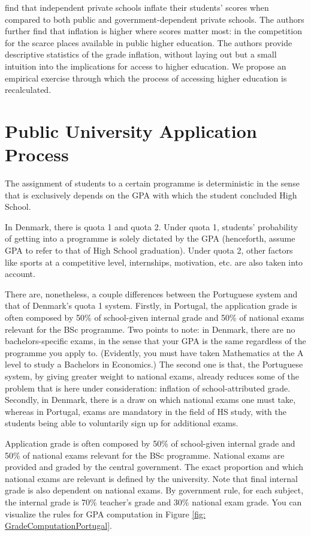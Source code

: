 \documentclass{article}
\begin{document}
\cite{nata2014unfairness} find that independent private schools inflate their students’ scores when compared to both public and government-dependent private schools. The authors further find that inflation is higher where scores matter most: in the competition for the scarce places available in public higher education. The authors provide descriptive statistics of the grade inflation, without laying out but a small intuition into the implications for access to higher education. We propose an empirical exercise through which the process of accessing higher education is recalculated.

\section{Public University Application Process}


The assignment of students to a certain programme is deterministic in the sense that is exclusively depends on the GPA with which the student concluded High School. 

In Denmark, there is quota 1 and quota 2. Under quota 1, students' probability of getting into a programme is solely dictated by the GPA (henceforth, assume GPA to refer to that of High School graduation). Under quota 2, other factors like sports at a competitive level, internships, motivation, etc. are also taken into account.

There are, nonetheless, a couple differences between the Portuguese system and that of Denmark's quota 1 system. Firstly, in Portugal, the application grade is often composed by 50\% of school-given internal grade and 50\% of national exams relevant for the BSc programme. Two points to note: in Denmark, there are no bachelors-specific exams, in the sense that your GPA is the same regardless of the programme you apply to. (Evidently, you must have taken Mathematics at the A level to study a Bachelors in Economics.) The second one is that, the Portuguese system, by giving greater weight to national exams, already reduces some of the problem that is here under consideration: inflation of school-attributed grade.
Secondly, in Denmark, there is a draw on which national exams one must take, whereas in Portugal, exams are mandatory in the field of HS study, with the students being able to voluntarily sign up for additional exams.


Application grade is often composed by 50\% of school-given internal grade and 50\% of national exams relevant for the BSc programme. National exams are provided and graded by the central government. The exact proportion and which national exams are relevant is defined by the university.
Note that final internal grade is also dependent on national exams. By government rule, for each subject, the internal grade is 70\% teacher's grade and 30\% national exam grade. You can visualize the rules for GPA computation in Figure \ref{fig: GradeComputationPortugal}.
\end{document}
